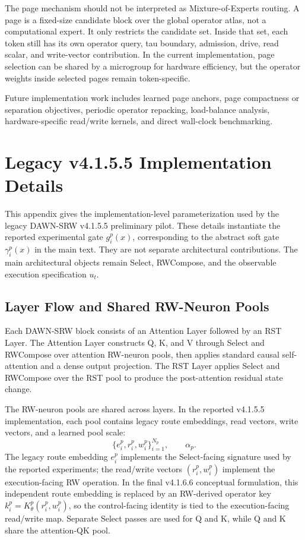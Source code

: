 \documentclass{article}
\begin{document}
The page mechanism should not be interpreted as Mixture-of-Experts routing. A page is a fixed-size candidate block over the global operator atlas, not a computational expert. It only restricts the candidate set. Inside that set, each token still has its own operator query, tau boundary, admission, drive, read scalar, and write-vector contribution. In the current implementation, page selection can be shared by a microgroup for hardware efficiency, but the operator weights inside selected pages remain token-specific.

Future implementation work includes learned page anchors, page compactness or separation objectives, periodic operator repacking, load-balance analysis, hardware-specific read/write kernels, and direct wall-clock benchmarking.

\section{Legacy v4.1.5.5 Implementation Details}
\label{app:select_parameterization}

This appendix gives the implementation-level parameterization used by the legacy DAWN-SRW v4.1.5.5 preliminary pilot. These details instantiate the reported experimental gate \(g_i^p(x)\), corresponding to the abstract soft gate \(\gamma_i^p(x)\) in the main text. They are not separate architectural contributions. The main architectural objects remain Select, RWCompose, and the observable execution specification $u_t$.

\subsection{Layer Flow and Shared RW-Neuron Pools}

Each DAWN-SRW block consists of an Attention Layer followed by an RST Layer. The Attention Layer constructs Q, K, and V through Select and RWCompose over attention RW-neuron pools, then applies standard causal self-attention and a dense output projection. The RST Layer applies Select and RWCompose over the RST pool to produce the post-attention residual state change.

The RW-neuron pools are shared across layers. In the reported v4.1.5.5 implementation, each pool contains legacy route embeddings, read vectors, write vectors, and a learned pool scale:
\begin{equation}
    \{e_i^p,r_i^p,w_i^p\}_{i=1}^{N_p}, \qquad \alpha_p .
\end{equation}
The legacy route embedding $e_i^p$ implements the Select-facing signature used by the reported experiments; the read/write vectors $(r_i^p,w_i^p)$ implement the execution-facing RW operation. In the final v4.1.6.6 conceptual formulation, this independent route embedding is replaced by an RW-derived operator key \(k_i^p=K_\theta^p(r_i^p,w_i^p)\), so the control-facing identity is tied to the execution-facing read/write map. Separate Select passes are used for Q and K, while Q and K share the attention-QK pool.
\end{document}
